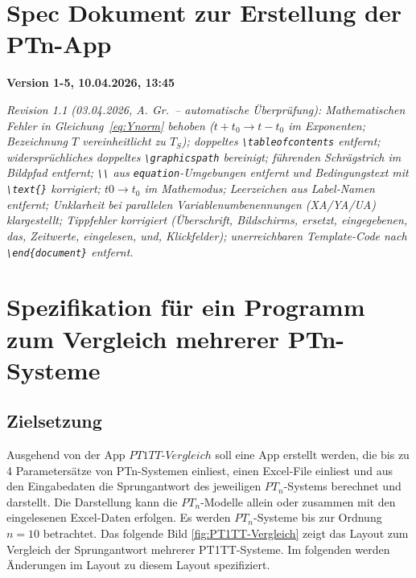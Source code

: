 \documentclass[main.tex]{subfiles}
\begin{document}
\graphicspath{{Images/I2f16/}} %

\chapter{Spec Dokument zur Erstellung der PTn-App}
\textbf{Version 1-5, 10.04.2026, 13:45}

\begin{small}
\textit{%
Revision 1.1 (03.04.2026, A. Gr.\ – automatische Überprüfung):
Mathematischen Fehler in Gleichung~\ref{eq:Ynorm} behoben
($t+t_0 \rightarrow t-t_0$ im Exponenten;
Bezeichnung $T$ vereinheitlicht zu $T_S$);
doppeltes \texttt{\textbackslash tableofcontents} entfernt;
widersprüchliches doppeltes \texttt{\textbackslash graphicspath} bereinigt;
führenden Schrägstrich im Bildpfad entfernt;
\texttt{\textbackslash\textbackslash} aus \texttt{equation}-Umgebungen entfernt
und Bedingungstext mit \texttt{\textbackslash text\{\}} korrigiert;
$t0 \rightarrow t_0$ im Mathemodus;
Leerzeichen aus Label-Namen entfernt;
Unklarheit bei parallelen Variablenumbenennungen (XA/YA/UA) klargestellt;
Tippfehler korrigiert (Überschrift, Bildschirms, ersetzt, eingegebenen,
das, Zeitwerte, eingelesen, und, Klickfelder);
unerreichbaren Template-Code nach \texttt{\textbackslash end\{document\}} entfernt.
}
\end{small}

\tableofcontents  %

\chapter{Spezifikation für ein Programm zum Vergleich mehrerer PTn-Systeme}
\section{Zielsetzung}
Ausgehend von der App $PT1TT\text{-}Vergleich$ soll eine App erstellt werden, die bis zu 4 Parametersätze von PTn-Systemen einliest, einen Excel-File einliest und aus den Eingabedaten die Sprungantwort des jeweiligen $PT_n$-Systems berechnet und darstellt.
Die Darstellung kann die $PT_n$-Modelle allein oder zusammen mit den eingelesenen Excel-Daten erfolgen.
Es werden $PT_n$-Systeme bis zur Ordnung $n=10$ betrachtet.
Das folgende Bild \ref{fig:PT1TT-Vergleich} zeigt das Layout zum Vergleich der Sprungantwort mehrerer PT1TT-Systeme. Im folgenden werden Änderungen im Layout zu diesem Layout spezifiziert.
\end{document}
